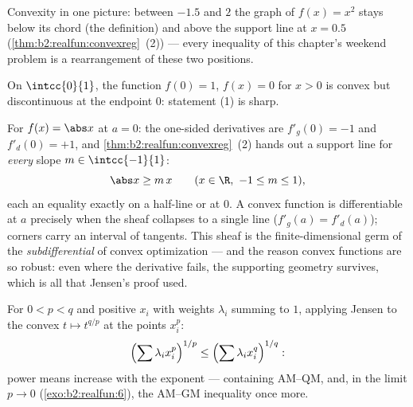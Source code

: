 \begin{omfigure}

{\small Convexity in one picture: between $-1.5$ and $2$ the
graph of $f(x) = x^2$ stays below its chord (the definition) and
above the support line at $x = 0.5$
(\cref{thm:b2:realfun:convexreg}~(2)) --- every inequality of this
chapter's weekend problem is a rearrangement of these two
positions.}
\end{omfigure}

\begin{example}
On $\intcc{0}{1}$, the function $f(0) = 1$, $f(x) = 0$ for $x > 0$
is convex but discontinuous at the endpoint $0$: statement (1) is
sharp.
\end{example}

\begin{example}\label{ex:b2:realfun:corner}
For $f(x) = \abs x$ at $a = 0$: the one-sided derivatives are
$f'_g(0) = -1$ and $f'_d(0) = +1$, and
\cref{thm:b2:realfun:convexreg}~(2) hands out a support line for
\emph{every} slope $m \in \intcc{-1}{1}$:
\[
\abs x \geq m\,x \qquad (x \in \R,\ -1 \leq m \leq 1),
\]
each an equality exactly on a half-line or at $0$. A convex
function is differentiable at $a$ precisely when the sheaf
collapses to a single line ($f'_g(a) = f'_d(a)$); corners carry
an interval of tangents. This sheaf is the finite-dimensional
germ of the \emph{subdifferential} of convex optimization ---
and the reason convex functions are so robust: even where the
derivative fails, the supporting geometry survives, which is all
that Jensen's proof used.
\end{example}

\begin{example}\label{ex:b2:realfun:powermeans}
For $0 < p < q$ and positive $x_i$ with weights $\lambda_i$
summing to $1$, applying Jensen to the convex $t \mapsto t^{q/p}$
at the points $x_i^p$:
\[
\Bigl(\sum \lambda_i x_i^{p}\Bigr)^{1/p}
\leq \Bigl(\sum \lambda_i x_i^{q}\Bigr)^{1/q} :
\]
power means increase with the exponent --- containing AM--QM, and,
in the limit $p \to 0$ (\cref{exo:b2:realfun:6}), the AM--GM
inequality once more.
\end{example}


